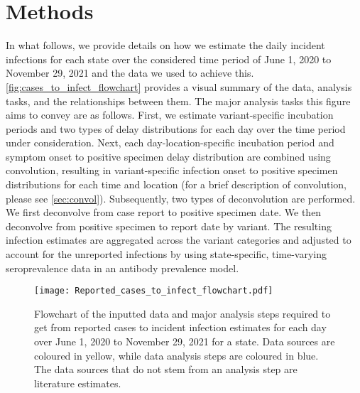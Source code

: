 \section{Methods}
\label{sec:methods}


In what follows, we provide details on how we estimate the daily incident
infections for each state over the considered time period of June 1, 2020 to
November 29, 2021 and the data we used to achieve this.
\autoref{fig:cases_to_infect_flowchart} provides a visual summary of the data,
analysis tasks, and the relationships between them. The major analysis tasks
this figure aims to convey are as follows. First, we estimate variant-specific
incubation periods and two types of delay distributions for each day over the
time period under consideration. Next, each day-location-specific incubation
period and symptom onset to positive specimen delay distribution are combined
using convolution, resulting in variant-specific infection onset to positive
specimen distributions for each time and location (for a brief description of
convolution, please see \autoref{sec:convol}). Subsequently, two types of
deconvolution are performed. We first deconvolve from case report to positive
specimen date. We then deconvolve from positive specimen to report date by
variant. The resulting infection estimates are aggregated across the variant
categories and adjusted to account for the unreported infections by using
state-specific, time-varying seroprevalence data in an antibody prevalence
model. 


\begin{figure}[!tb]
\centering
    \texttt{[image: Reported\_cases\_to\_infect\_flowchart.pdf]} 
    \caption{Flowchart of the inputted data and major analysis steps required to
    get from reported cases to incident infection estimates for each day over
    June 1, 2020 to November 29, 2021 for a state. Data sources are coloured in
    yellow, while data analysis steps are coloured in blue. The data sources
    that do not stem from an analysis step are literature estimates.}
    \label{fig:cases_to_infect_flowchart}
\end{figure}









